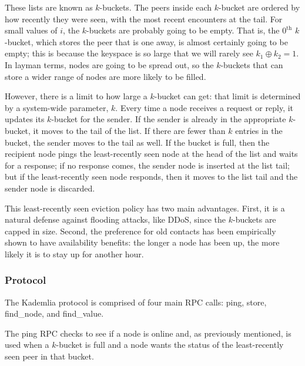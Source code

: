 \documentclass[12pt,twocolumn]{article}
\begin{document}
These lists are known as $k$-buckets.
The peers inside each $k$-bucket are ordered by how recently they were seen, with the most recent encounters at the tail.
For small values of $i$, the $k$-buckets are probably going to be empty.
That is, the $0^{\mathrm{th}}$ $k$-bucket, which stores the peer that is one away, is almost certainly going to be empty; this is because the keyspace is so large that we will rarely see $k_1 \oplus k_2 = 1$.
In layman terms, nodes are going to be spread out, so the $k$-buckets that can store a wider range of nodes are more likely to be filled.

However, there is a limit to how large a $k$-bucket can get: that limit is determined by a system-wide parameter, $k$. Every time a node receives a request or reply, it updates its $k$-bucket for the sender. If the sender is already in the appropriate $k$-bucket, it moves to the tail of the list. If there are fewer than $k$ entries in the bucket, the sender moves to the tail as well. If the bucket is full, then the recipient node pings the least-recently seen node at the head of the list and waits for a response; if no response comes, the sender node is inserted at the list tail; but if the least-recently seen node responds, then it moves to the list tail and the sender node is discarded.

This least-recently seen eviction policy has two main advantages. First, it is a natural defense against flooding attacks, like DDoS, since the $k$-buckets are capped in size. Second, the preference for old contacts has been empirically shown to have availability benefits: the longer a node has been up, the more likely it is to stay up for another hour.

\subsubsection{Protocol}
\newcommand{\findNode}{}
\def\findNode/{{\sc find\_node}}
\newcommand{\findValue}{}
\def\findValue/{{\sc find\_value}}
\newcommand{\ping}{}
\def\ping/{{\sc ping}}
\newcommand{\store}{}
\def\store/{{\sc store}}

The Kademlia protocol is comprised of four main RPC calls: \ping/, \store/, \findNode/, and \findValue/.

The \ping/ RPC checks to see if a node is online and, as previously mentioned, is used when a $k$-bucket is full and a node wants the status of the least-recently seen peer in that bucket.
\end{document}
